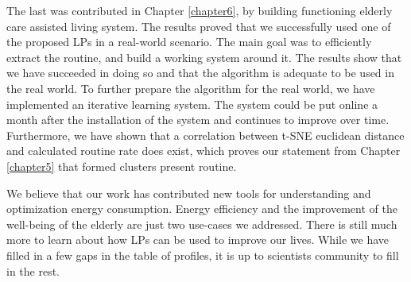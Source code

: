 The last was contributed in Chapter \ref{chapter6}, by building functioning elderly care assisted living system. 
The results proved that we successfully used one of the proposed LPs in a real-world scenario. 
The main goal was to efficiently extract the routine, and build a working system around it.
The results show that we have succeeded in doing so and that the algorithm is adequate to be used in the real world.
To further prepare the algorithm for the real world, we have implemented an iterative learning system.
The system could be put online a month after the installation of the system and continues to improve over time.
Furthermore, we have shown that a correlation between t-SNE euclidean distance and calculated routine rate does exist,
which proves our statement from Chapter \ref{chapter5} that formed clusters present routine.

We believe that our work has contributed new tools for understanding and optimization energy consumption.
Energy efficiency and the improvement of the well-being of the elderly are just two use-cases we addressed.
There is still much more to learn about how LPs can be used to improve our lives.
While we have filled in a few gaps in the table of profiles, it is up to scientists community to fill in the rest.



